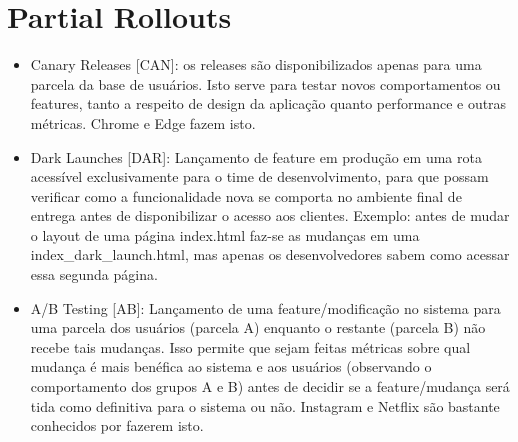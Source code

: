 \section{Partial Rollouts}
\begin{itemize}
    \item Canary Releases [CAN]: os releases são disponibilizados apenas para uma parcela da base de usuários. Isto serve para testar novos comportamentos ou features, tanto a respeito de design da aplicação quanto performance e outras métricas. Chrome e Edge fazem isto.
    \item Dark Launches [DAR]: Lançamento de feature em produção em uma rota acessível exclusivamente para o time de desenvolvimento, para que possam verificar como a funcionalidade nova se comporta no ambiente final de entrega antes de disponibilizar o acesso aos clientes. Exemplo: antes de mudar o layout de uma página index.html faz-se as mudanças em uma index\_dark\_launch.html, mas apenas os desenvolvedores sabem como acessar essa segunda página.
    \item A/B Testing [AB]: Lançamento de uma feature/modificação no sistema para uma parcela dos usuários (parcela A) enquanto o restante (parcela B) não recebe tais mudanças. Isso permite que sejam feitas métricas sobre qual mudança é mais benéfica ao sistema e aos usuários (observando o comportamento dos grupos A e B) antes de decidir se a feature/mudança será tida como definitiva para o sistema ou não. Instagram e Netflix são bastante conhecidos por fazerem isto.
\end{itemize}
